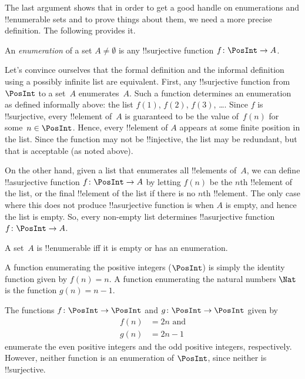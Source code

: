 \documentclass[../../../include/open-logic-section]{subfiles}
\begin{document}
The last argument shows that in order to get a good handle on
enumerations and !!{enumerable} sets and to prove things about them,
we need a more precise definition.  The following provides it.

\begin{defn} 
An \emph{enumeration} of a set $A \neq \emptyset$ is any
!!{surjective} function $f \colon \PosInt \to A$.
\end{defn}

\begin{explain}
Let's convince ourselves that the formal definition and the informal
definition using a possibly infinite list are equivalent. First, any
!!{surjective} function from $\PosInt$ to a set~$A$ enumerates~$A$.
Such a function determines an enumeration as defined informally above:
the list $f(1)$, $f(2)$, $f(3)$, \dots. Since $f$ is !!{surjective},
every !!{element} of~$A$ is guaranteed to be the value of~$f(n)$ for
some~$n \in \PosInt$. Hence, every !!{element} of $A$ appears at some
finite position in the list. Since the function may not be
!!{injective}, the list may be redundant, but that is acceptable (as
noted above).

On the other hand, given a list that enumerates all !!{element}s
of~$A$, we can define !!a{surjective} function $f\colon \PosInt \to A$
by letting $f(n)$ be the $n$th !!{element} of the list, or the final
!!{element} of the list if there is no $n$th !!{element}. The only
case where this does not produce !!a{surjective} function is when $A$ is
empty, and hence the list is empty. So, every non-empty list
determines !!a{surjective} function $f\colon \PosInt \to A$.
\end{explain}

\begin{defn}
  A set~$A$ is !!{enumerable} iff it is empty or has an enumeration.
\end{defn}

\begin{ex}
A function enumerating the positive integers ($\PosInt$) is simply the
identity function given by $f(n) = n$. A function enumerating the
natural numbers $\Nat$ is the function $g(n) = n - 1$.
\end{ex}

\begin{ex}
The functions $f\colon \PosInt \to \PosInt$ and $g \colon \PosInt \to
\PosInt$ given by
\begin{align*}
f(n) & = 2n \text{ and}\\
g(n) & = 2n - 1
\end{align*}
enumerate the even positive integers and the odd positive integers,
respectively. However, neither function is an enumeration of
$\PosInt$, since neither is !!{surjective}.
\end{ex}
\end{document}
